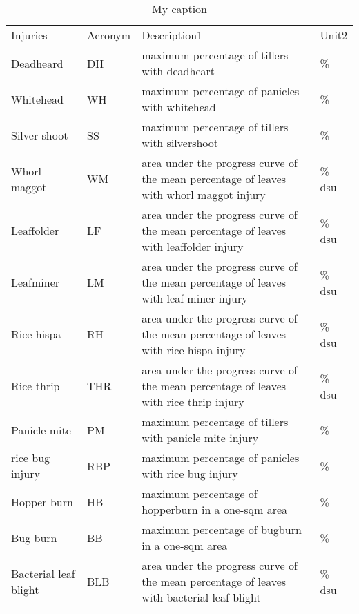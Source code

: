 \begin{table}[]
\centering
\caption{My caption}
\label{my-label}
\begin{tabular}{llll}
Injuries              & Acronym & Description1                                                                              & Unit2  \\
Deadheard             & DH      & maximum percentage of tillers with deadheart                                              & \%     \\
Whitehead             & WH      & maximum percentage of panicles with whitehead                                             & \%     \\
Silver shoot          & SS      & maximum percentage of tillers with silvershoot                                            & \%     \\
Whorl maggot          & WM      & area under the progress curve of the mean percentage of leaves with whorl maggot injury   & \% dsu \\
Leaffolder            & LF      & area under the progress curve of the mean percentage of leaves with leaffolder injury     & \% dsu \\
Leafminer             & LM      & area under the progress curve of the mean percentage of leaves with leaf miner injury     & \% dsu \\
Rice hispa            & RH      & area under the progress curve of the mean percentage of leaves with rice hispa injury     & \% dsu \\
Rice thrip            & THR     & area under the progress curve of the mean percentage of leaves with rice thrip injury     & \% dsu \\
Panicle mite          & PM      & maximum percentage of tillers with panicle mite injury                                    & \%     \\
rice bug injury       & RBP     & maximum percentage of panicles with rice bug injury                                       & \%     \\
Hopper burn           & HB      & maximum percentage of hopperburn in a one-sqm area                                        & \%     \\
Bug burn              & BB      & maximum percentage of bugburn in a one-sqm area                                           & \%     \\
Bacterial leaf blight & BLB     & area under the progress curve of the mean percentage of leaves with bacterial leaf blight & \% dsu \\

\end{tabular}
\end{table}
